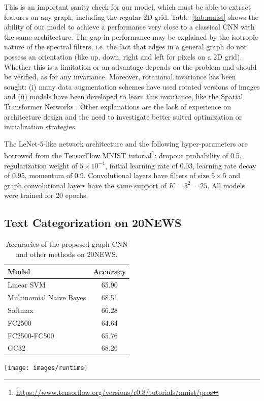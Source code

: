 \documentclass{article}
\newcommand{\tabref}[1]{Table~\ref{tab:#1}}
\newcommand{\todo}[1]{{\color{red} #1 }}
\begin{document}
This is an important sanity check for our model, which must be able to extract
features on any graph, including the regular 2D grid. \tabref{mnist} shows the
ability of our model to achieve a performance very close to a classical CNN
with the same architecture. The gap in performance may be explained by the
isotropic nature of the spectral filters, i.e. the fact that edges in a general
graph do not possess an orientation (like up, down, right and left for pixels
on a 2D grid). Whether this is a limitation or an advantage depends on the
problem and should be verified, as for any invariance. Moreover, rotational
invariance has been sought: (i) many data augmentation schemes have used
rotated versions of images and (ii) models have been developed to learn this
invariance, like the Spatial Transformer Networks \cite{jaderberg2015spatial}.
Other explanations are the lack of experience on architecture design and the
need to investigate better suited optimization or initialization strategies.

The LeNet-5-like network architecture and the following hyper-parameters are
borrowed from the TensorFlow MNIST tutorial\footnote{
\url{https://www.tensorflow.org/versions/r0.8/tutorials/mnist/pros}}: dropout
probability of 0.5, regularization weight of $5\times10^{-4}$, initial learning
rate of 0.03, learning rate decay of 0.95, momentum of 0.9. Convolutional layers
have filters of size $5 \times 5$ and graph convolutional layers have the same
support of $K = 5^2 = 25$. All models were trained for 20 epochs.

\subsection{Text Categorization on 20NEWS}

\begin{table}[t]
\begin{minipage}[b]{0.42\linewidth}
	\centering
	\begin{tabular}[b]{lc}
		\toprule
		Model & Accuracy \\
		\midrule
		Linear SVM & 65.90 \\
		Multinomial Naive Bayes & 68.51 \\
		Softmax & 66.28 \\
		\addlinespace
		FC2500 & 64.64 \\
		FC2500-FC500 & 65.76 \\
		\addlinespace
		GC32 & 68.26 \\
		\bottomrule
	\end{tabular}
	\caption{Accuracies of the proposed graph CNN and other
	methods on 20NEWS.} 
	\label{tab:20news}
\end{minipage}
\hfill
\begin{minipage}[b]{0.55\linewidth}
	\centering
	\texttt{[image: images/runtime]}
	\label{fig:runtime}
\end{minipage}
\end{table}
\end{document}
